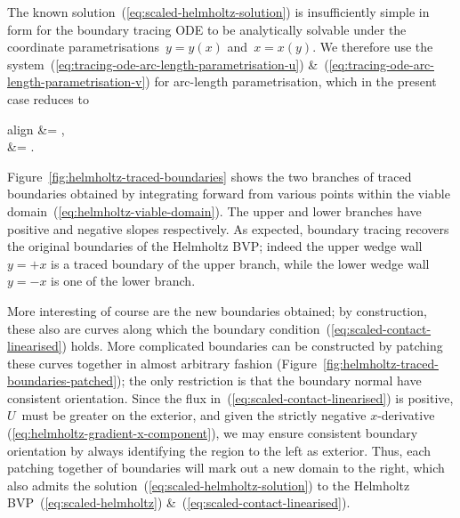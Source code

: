 The known solution~(\ref{eq:scaled-helmholtz-solution})
is insufficiently simple in form
for the boundary tracing ODE to be analytically solvable
under the coordinate parametrisations~$y = y (x)$ and~$x = x (y)$.
We therefore use the system~(\ref{eq:tracing-ode-arc-length-parametrisation-u})
\&~(\ref{eq:tracing-ode-arc-length-parametrisation-v})
for arc-length parametrisation,
which in the present case reduces to
\begin{important}{align}
   &= ,
    \label{eq:helmholtz-tracing-ode-arc-length-parametrisation-x}
    \\[\tallspace]
   &= .
    \label{eq:helmholtz-tracing-ode-arc-length-parametrisation-y}
\end{important}
Figure~\ref{fig:helmholtz-traced-boundaries}
shows the two branches of traced boundaries obtained
by integrating forward from various points
within the viable domain~(\ref{eq:helmholtz-viable-domain}).
The upper and lower branches have positive and negative slopes respectively.
As expected,
boundary tracing recovers the original boundaries of the Helmholtz BVP\@;
indeed the upper wedge wall~$y = +x$ is a traced boundary of the upper branch,
while the lower wedge wall~$y = -x$ is one of the lower branch.

\begin{figure}
\end{figure}

More interesting of course are the new boundaries obtained;
by construction, these also are curves
along which the boundary condition~(\ref{eq:scaled-contact-linearised}) holds.
More complicated boundaries can be constructed
by patching these curves together in almost arbitrary fashion
(Figure~\ref{fig:helmholtz-traced-boundaries-patched});
the only restriction is that the boundary normal
have consistent orientation.
Since the flux in~(\ref{eq:scaled-contact-linearised}) is positive,
$U$~must be greater on the exterior,
and given the strictly negative $x$-derivative~%
  (\ref{eq:helmholtz-gradient-x-component}),
we may ensure consistent boundary orientation
by always identifying the region to the left as exterior.
Thus, each patching together of boundaries
will mark out a new domain to the right,
which also admits the solution~(\ref{eq:scaled-helmholtz-solution})
to the Helmholtz BVP~(\ref{eq:scaled-helmholtz})
\&~(\ref{eq:scaled-contact-linearised}).

